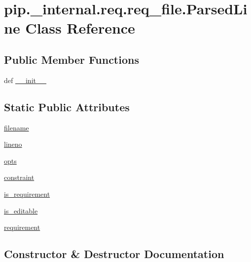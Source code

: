 \hypertarget{classpip_1_1__internal_1_1req_1_1req__file_1_1ParsedLine}{}\section{pip.\+\_\+internal.\+req.\+req\+\_\+file.\+Parsed\+Line Class Reference}
\label{classpip_1_1__internal_1_1req_1_1req__file_1_1ParsedLine}
\subsection*{Public Member Functions}
\begin{DoxyCompactItemize}
\item 
def \hyperlink{classpip_1_1__internal_1_1req_1_1req__file_1_1ParsedLine_a21a7969440e40d6001d1952708b0619b}{\+\_\+\+\_\+init\+\_\+\+\_\+}
\end{DoxyCompactItemize}
\subsection*{Static Public Attributes}
\begin{DoxyCompactItemize}
\item 
\hyperlink{classpip_1_1__internal_1_1req_1_1req__file_1_1ParsedLine_a757799da9568354a38e4002639e0fd49}{filename}
\item 
\hyperlink{classpip_1_1__internal_1_1req_1_1req__file_1_1ParsedLine_abd3ce72780c71151e5a34a1d7490eb6c}{lineno}
\item 
\hyperlink{classpip_1_1__internal_1_1req_1_1req__file_1_1ParsedLine_adcac08e5e838397199d8e8c9ff0c4a12}{opts}
\item 
\hyperlink{classpip_1_1__internal_1_1req_1_1req__file_1_1ParsedLine_ac1fc98644a7f884fe226d94fcdf5cd6b}{constraint}
\item 
\hyperlink{classpip_1_1__internal_1_1req_1_1req__file_1_1ParsedLine_a5e3458d1e21c52b9fe8da057576d06df}{is\+\_\+requirement}
\item 
\hyperlink{classpip_1_1__internal_1_1req_1_1req__file_1_1ParsedLine_a42f72e31dd03cf5f4d23e688390f0461}{is\+\_\+editable}
\item 
\hyperlink{classpip_1_1__internal_1_1req_1_1req__file_1_1ParsedLine_a52f2abc5788c48c38c0c22235bb258e3}{requirement}
\end{DoxyCompactItemize}


\subsection{Constructor \& Destructor Documentation}
\mbox{\label{classpip_1_1__internal_1_1req_1_1req__file_1_1ParsedLine_a21a7969440e40d6001d1952708b0619b}} 
